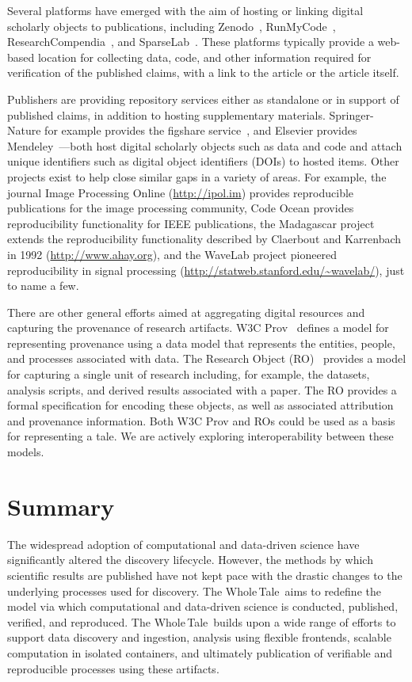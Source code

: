 \documentclass[review]{elsarticle}
\newcommand{\wt}{Whole\,Tale}
\begin{document}
Several platforms have emerged with the aim of hosting or linking digital scholarly objects to publications, including Zenodo~\cite{zenodo}, RunMyCode~\cite{stodden12runmycode}, ResearchCompendia~\cite{stodden15resaerchcompendia}, and SparseLab~\cite{sparselab}. 
These platforms typically provide a web-based location for collecting data, code, and 
other information required for verification of the published claims, with a link to 
the article or the article itself.

Publishers are providing repository services either as standalone or in support of published claims, in addition to hosting supplementary materials. Springer-Nature for example provides the figshare service~\cite{figshare}, and Elsevier provides Mendeley~\cite{mendeley}---both host digital scholarly objects such as data and code and attach unique identifiers such as digital object identifiers (DOIs) to hosted items. Other projects exist to help close similar gaps in a variety of areas. For example, the journal Image Processing Online (\url{http://ipol.im}) provides reproducible publications for the image processing community, Code Ocean provides reproducibility functionality for IEEE publications, the Madagascar project extends the reproducibility functionality described by Claerbout and Karrenbach in 1992 (\url{http://www.ahay.org}), and the WaveLab project pioneered reproducibility in signal processing (\url{http://statweb.stanford.edu/~wavelab/}), just to name a few.

There are other general efforts aimed at aggregating 
digital resources and capturing the provenance of research artifacts.
W3C Prov~\cite{w3c-prov-primer} defines a model 
for representing provenance using a data model that 
represents the entities, people, and processes 
associated with data.  
The Research Object (RO)~\cite{bechhofer2010research}
provides a model for capturing a single unit of research including, for example,
the datasets, analysis scripts, and derived results associated 
with a paper. The RO provides a formal specification for 
encoding these objects, as well as associated attribution
and provenance information. Both W3C Prov and ROs could 
be used as a basis for representing a tale. We are actively
exploring interoperability between these models.

\section{Summary}\label{sec:summary}

The widespread adoption of computational and data-driven science have significantly
altered the discovery lifecycle. However, the methods by which scientific results are 
published have not kept pace with the drastic changes to the underlying processes used for discovery. 
The \wt\ aims to redefine the model via
which computational and data-driven science is conducted, published, 
verified, and reproduced. The \wt\ builds upon a wide range
of efforts to support data discovery and ingestion, 
analysis using flexible frontends, scalable
computation in isolated containers, and ultimately
publication of verifiable and reproducible processes
using these artifacts. 
\end{document}
